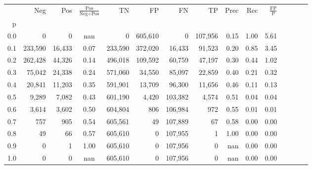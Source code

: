 \begin{tabular}{rrrcrrrrrrrrrrr}
\toprule
{} &      Neg &     Pos & $\frac{\text{Pos}}{\text{Neg}+\text{Pos}}$ &       TN &       FP &       FN &       TP &  Prec &   Rec & $\frac{\text{FP}}{\text{P}}$ \\
p   &          &         &                                            &          &          &          &          &       &       &                              \\
\midrule
0.0 &        0 &       0 &                                        nan &        0 &  605,610 &        0 &  107,956 &  0.15 &  1.00 &                         5.61 \\
0.1 &  233,590 &  16,433 &                                       0.07 &  233,590 &  372,020 &   16,433 &   91,523 &  0.20 &  0.85 &                         3.45 \\
0.2 &  262,428 &  44,326 &                                       0.14 &  496,018 &  109,592 &   60,759 &   47,197 &  0.30 &  0.44 &                         1.02 \\
0.3 &   75,042 &  24,338 &                                       0.24 &  571,060 &   34,550 &   85,097 &   22,859 &  0.40 &  0.21 &                         0.32 \\
0.4 &   20,841 &  11,203 &                                       0.35 &  591,901 &   13,709 &   96,300 &   11,656 &  0.46 &  0.11 &                         0.13 \\
0.5 &    9,289 &   7,082 &                                       0.43 &  601,190 &    4,420 &  103,382 &    4,574 &  0.51 &  0.04 &                         0.04 \\
0.6 &    3,614 &   3,602 &                                       0.50 &  604,804 &      806 &  106,984 &      972 &  0.55 &  0.01 &                         0.01 \\
0.7 &      757 &     905 &                                       0.54 &  605,561 &       49 &  107,889 &       67 &  0.58 &  0.00 &                         0.00 \\
0.8 &       49 &      66 &                                       0.57 &  605,610 &        0 &  107,955 &        1 &  1.00 &  0.00 &                         0.00 \\
0.9 &        0 &       1 &                                       1.00 &  605,610 &        0 &  107,956 &        0 &   nan &  0.00 &                         0.00 \\
1.0 &        0 &       0 &                                        nan &  605,610 &        0 &  107,956 &        0 &   nan &  0.00 &                         0.00 \\
\bottomrule
\end{tabular}
